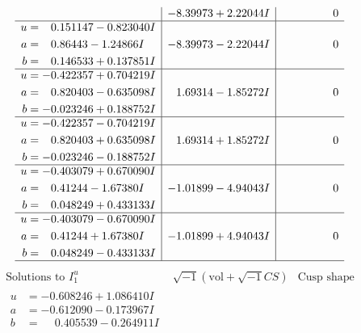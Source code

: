 \documentclass[1p]{elsarticle_modified}
\theoremstyle{definition}
\newcommand{\I}{\sqrt{-1}}
\begin{document}
$$\begin{array}{c|c|c}
 & -8.39973 + 2.22044 I & \phantom{-0.000000 } 0 \\ \hline\begin{aligned}
u &= \phantom{-}0.151147 - 0.823040 I \\
a &= \phantom{-}0.86443 - 1.24866 I \\
b &= \phantom{-}0.146533 + 0.137851 I\end{aligned}
 & -8.39973 - 2.22044 I & \phantom{-0.000000 } 0 \\ \hline\begin{aligned}
u &= -0.422357 + 0.704219 I \\
a &= \phantom{-}0.820403 - 0.635098 I \\
b &= -0.023246 + 0.188752 I\end{aligned}
 & \phantom{-}1.69314 - 1.85272 I & \phantom{-0.000000 } 0 \\ \hline\begin{aligned}
u &= -0.422357 - 0.704219 I \\
a &= \phantom{-}0.820403 + 0.635098 I \\
b &= -0.023246 - 0.188752 I\end{aligned}
 & \phantom{-}1.69314 + 1.85272 I & \phantom{-0.000000 } 0 \\ \hline\begin{aligned}
u &= -0.403079 + 0.670090 I \\
a &= \phantom{-}0.41244 - 1.67380 I \\
b &= \phantom{-}0.048249 + 0.433133 I\end{aligned}
 & -1.01899 - 4.94043 I & \phantom{-0.000000 } 0 \\ \hline\begin{aligned}
u &= -0.403079 - 0.670090 I \\
a &= \phantom{-}0.41244 + 1.67380 I \\
b &= \phantom{-}0.048249 - 0.433133 I\end{aligned}
 & -1.01899 + 4.94043 I & \phantom{-0.000000 } 0\\
 \hline 
 \end{array}$$\newpage$$\begin{array}{c|c|c}  
\text{Solutions to }I^u_{1}& \I (\text{vol} + \sqrt{-1}CS) & \text{Cusp shape}\\
 \hline 
\begin{aligned}
u &= -0.608246 + 1.086410 I \\
a &= -0.612090 - 0.173967 I \\
b &= \phantom{-}0.405539 - 0.264911 I\end{aligned}

\end{array}$$
\end{document}
